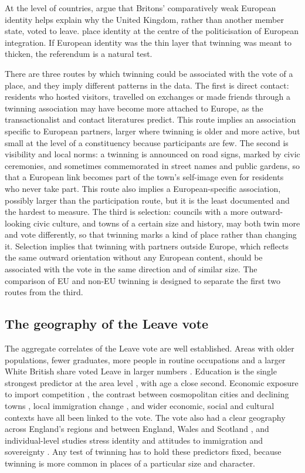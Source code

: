 \documentclass[11pt,a4paper]{article}
\begin{document}
At the level of countries, \citet{carl2019} argue that Britons' comparatively weak European identity helps explain why the United Kingdom, rather than another member state, voted to leave. \citet{hooghe2009} place identity at the centre of the politicisation of European integration. If European identity was the thin layer that twinning was meant to thicken, the referendum is a natural test.

There are three routes by which twinning could be associated with the vote of a place, and they imply different patterns in the data. The first is direct contact: residents who hosted visitors, travelled on exchanges or made friends through a twinning association may have become more attached to Europe, as the transactionalist and contact literatures predict. This route implies an association specific to European partners, larger where twinning is older and more active, but small at the level of a constituency because participants are few. The second is visibility and local norms: a twinning is announced on road signs, marked by civic ceremonies, and sometimes commemorated in street names and public gardens, so that a European link becomes part of the town's self-image even for residents who never take part. This route also implies a European-specific association, possibly larger than the participation route, but it is the least documented and the hardest to measure. The third is selection: councils with a more outward-looking civic culture, and towns of a certain size and history, may both twin more and vote differently, so that twinning marks a kind of place rather than changing it. Selection implies that twinning with partners outside Europe, which reflects the same outward orientation without any European content, should be associated with the vote in the same direction and of similar size. The comparison of EU and non-EU twinning is designed to separate the first two routes from the third.

\subsection{The geography of the Leave vote}
The aggregate correlates of the Leave vote are well established. Areas with older populations, fewer graduates, more people in routine occupations and a larger White British share voted Leave in larger numbers \citep{goodwin2016,becker2017,harris2016,alabrese2019}. Education is the single strongest predictor at the area level \citep{becker2017}, with age a close second. Economic exposure to import competition \citep{colantone2018}, the contrast between cosmopolitan cities and declining towns \citep{jennings2016}, local immigration change \citep{goodwin2017}, and wider economic, social and cultural contexts \citep{abreu2020} have all been linked to the vote. The vote also had a clear geography across England's regions and between England, Wales and Scotland \citep{johnston2018,hobolt2016}, and individual-level studies stress identity and attitudes to immigration and sovereignty \citep{clarke2017}. Any test of twinning has to hold these predictors fixed, because twinning is more common in places of a particular size and character.
\end{document}
